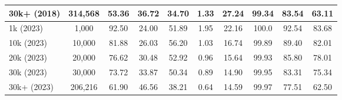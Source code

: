 \begin{table*}[]
{\begin{tabular}{lccccccccc}
30k+ (2018) & 314,568 & 53.36 & 36.72 & 34.70 & 1.33 & 27.24 & 99.34 & 83.54 & 63.11 \\ \hline
1k (2023) & 1,000 & 92.50 & 24.00 & 51.89 & 1.95 & 22.16 & 100.0 & 92.54 & 83.68 \\
10k (2023) & 10,000 & 81.88 & 26.03 & 56.20 & 1.03 & 16.74 & 99.89 & 89.40 & 82.01 \\
20k (2023) & 20,000 & 76.62 & 30.48 & 52.92 & 0.96 & 15.64 & 99.93 & 85.80 & 78.01 \\
30k (2023) & 30,000 & 73.72 & 33.87 & 50.34 & 0.89 & 14.90 & 99.95 & 83.31 & 75.34 \\
30k+ (2023) & 206,216 & 61.90 & 46.56 & 38.21 & 0.64 & 14.59 & 99.97 & 77.51 & 62.50 \\ \hline
\end{tabular}%
}
\end{table*}
